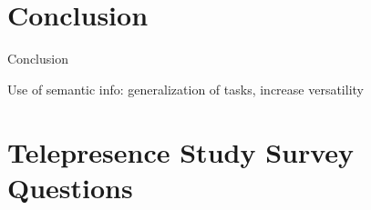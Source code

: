 \documentclass[12pt]{gatech-thesis}
\begin{document}












\chapter{Conclusion}
\label{chapter:conclusion}

Conclusion

Use of semantic info: generalization of tasks, increase versatility

\appendix

%
%
%
\chapter{Telepresence Study Survey Questions}
\label{chapter:telepresence_user_study_survey_questions}
\end{document}
